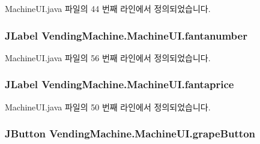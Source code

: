 Machine\+U\+I.\+java 파일의 44 번째 라인에서 정의되었습니다.

\subsubsection[{\texorpdfstring{fantanumber}{fantanumber}}]{\setlength{\rightskip}{0pt plus 5cm}J\+Label Vending\+Machine.\+Machine\+U\+I.\+fantanumber\hspace{0.3cm}{\ttfamily [private]}}\hypertarget{class_vending_machine_1_1_machine_u_i_a056f7147f4c21017754a69e423de114c}{}\label{class_vending_machine_1_1_machine_u_i_a056f7147f4c21017754a69e423de114c}


Machine\+U\+I.\+java 파일의 56 번째 라인에서 정의되었습니다.

\subsubsection[{\texorpdfstring{fantaprice}{fantaprice}}]{\setlength{\rightskip}{0pt plus 5cm}J\+Label Vending\+Machine.\+Machine\+U\+I.\+fantaprice\hspace{0.3cm}{\ttfamily [private]}}\hypertarget{class_vending_machine_1_1_machine_u_i_aa7ed131451f7a3a4879834c240d51b38}{}\label{class_vending_machine_1_1_machine_u_i_aa7ed131451f7a3a4879834c240d51b38}


Machine\+U\+I.\+java 파일의 50 번째 라인에서 정의되었습니다.

\subsubsection[{\texorpdfstring{grape\+Button}{grapeButton}}]{\setlength{\rightskip}{0pt plus 5cm}J\+Button Vending\+Machine.\+Machine\+U\+I.\+grape\+Button\hspace{0.3cm}{\ttfamily [private]}}\hypertarget{class_vending_machine_1_1_machine_u_i_a246588e3d736e1369da26163cf6b32d2}{}\label{class_vending_machine_1_1_machine_u_i_a246588e3d736e1369da26163cf6b32d2}


